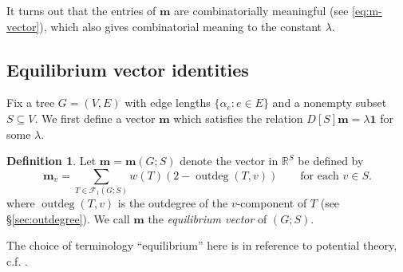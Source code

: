 \documentclass[12pt]{amsart}
\theoremstyle{definition}
\newtheorem{dfn}[thm]{Definition}
\newcommand{\RR}{\mathbb{R}}
\newcommand{\bone}{\mathbf{1}}
\newcommand{\boldm}{\mathbf{m}}
\newcommand{\trees}{\mathcal{F}_1}
\DeclareMathOperator{\outdeg}{outdeg}
\begin{document}
It turns out that the entries of $\boldm$ are combinatorially meaningful (see \eqref{eq:m-vector}),
which also gives combinatorial meaning to
the constant $\lambda$.

\subsection{Equilibrium vector identities}

Fix a tree $G = (V,E)$ with edge lengths $\{\alpha_e \colon e \in E\}$ and a nonempty subset $S \subseteq V$.
We first define a vector $\boldm$ which satisfies the relation $D[S] \boldm = \lambda \bone$ for some $\lambda$.

\begin{dfn}
\label{dfn:m-vector}
Let $\boldm = \boldm(G;S)$ denote the vector in $\RR^S$ be defined by
\begin{equation}
\label{eq:m-vector}
\boldm_v =  \sum_{T \in \trees(G;S)} w({T}) (2 - \outdeg(T,v))
\qquad\text{for each }v \in S.
\end{equation}
where $\outdeg(T,v)$ is the outdegree of the $v$-component of $T$ (see \S\ref{sec:outdegree}).
We call $\boldm$ the {\em equilibrium vector} of $(G; S)$.
\end{dfn}

The choice of terminology ``equilibrium'' here is in reference to potential theory, c.f. \cite{Tsu}\cite{steinerberger}.
\end{document}
